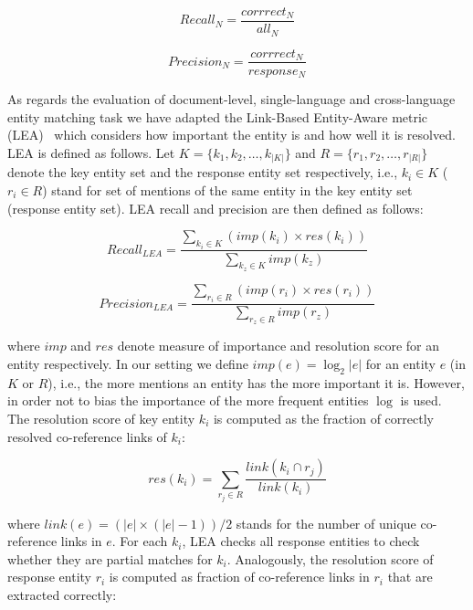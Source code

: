 \documentclass[11pt]{article}
\begin{document}
\begin{equation*}
	\mathit{Recall_{N}} = \frac{corrrect_{N}}{all_{N}}              
\end{equation*}

\begin{equation*}
	\mathit{Precision_{N}} = \frac{corrrect_{N}}{response_{N}}              
\end{equation*}

As regards the evaluation of document-level, single-language and cross-language entity matching task we have adapted the 
Link-Based Entity-Aware metric (LEA)~\cite{DBLP:conf-acl-Moosavi016} which considers how important the entity is and how well it is resolved. LEA is defined as follows. Let $K = \{k_1,k_2,\ldots,k_{|K|} \}$ and $R = \{r_1,r_2,\ldots,r_{|R|} \}$ denote the key entity set and the response entity set respectively, i.e., $k_i \in K$ ($r_i \in R$) stand for set of mentions
of the same entity in the key entity set (response entity set). LEA recall and precision are then defined as follows:

\begin{equation*}
	\mathit{Recall_{LEA}} = \frac{\sum_{k_{i} \in K} (\mathit{imp}(k_i) \times \mathit{res}(k_{i}))}
              {\sum_{k_{z} \in K} imp(k_{z})}
\end{equation*}

\begin{equation*}
	\mathit{Precision_{LEA}} = \frac{\sum_{r_{i} \in R} (\mathit{imp}(r_i) \times \mathit{res}(r_{i}))}
              {\sum_{r_{z} \in R} imp(r_{z})}
\end{equation*}

\noindent where $\mathit{imp}$ and $\mathit{res}$ denote measure of importance and resolution score for an entity respectively.
In our setting we define $\mathit{imp}(e) = \log_{2}|e|$ for an entity $e$ (in $K$ or $R$), i.e., the more mentions 
an entity has the more important it is. However, in order not to bias the importance of the more frequent entities $\log$ 
is used. The resolution score of key entity $k_i$ is computed as the fraction of correctly resolved co-reference 
links of $k_i$: 

\begin{equation*}
	\mathit{res}(k_i) = \sum_{r_{j} \in R} \frac{\mathit{link}(k_{i} \cap r_{j})}{\mathit{link}(k_{i})}
\end{equation*}

\noindent where $\mathit{link}(e) = (|e| \times (|e|-1))/2$ stands for the number of unique 
co-reference links in $e$. For each $k_i$, LEA checks all response entities to check whether 
they are partial matches for $k_i$. Analogously, the resolution score of response entity $r_i$ is
computed as fraction of co-reference links in $r_i$ that are extracted correctly:
\end{document}
